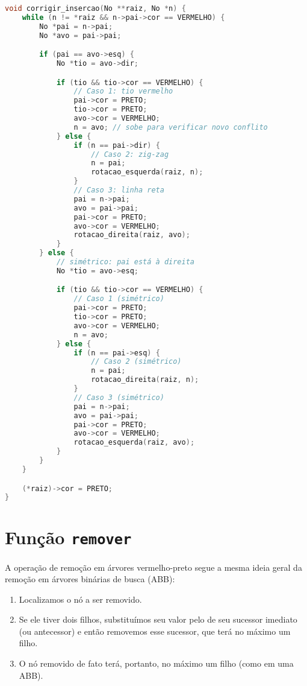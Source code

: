 \begin{lstlisting}[language=C, caption={Correção após inserção em árvore vermelho-preto}, label=lst:corrigir_insercao]
void corrigir_insercao(No **raiz, No *n) {
    while (n != *raiz && n->pai->cor == VERMELHO) {
        No *pai = n->pai;
        No *avo = pai->pai;

        if (pai == avo->esq) {
            No *tio = avo->dir;

            if (tio && tio->cor == VERMELHO) {
                // Caso 1: tio vermelho
                pai->cor = PRETO;
                tio->cor = PRETO;
                avo->cor = VERMELHO;
                n = avo; // sobe para verificar novo conflito
            } else {
                if (n == pai->dir) {
                    // Caso 2: zig-zag
                    n = pai;
                    rotacao_esquerda(raiz, n);
                }
                // Caso 3: linha reta
                pai = n->pai;
                avo = pai->pai;
                pai->cor = PRETO;
                avo->cor = VERMELHO;
                rotacao_direita(raiz, avo);
            }
        } else {
            // simétrico: pai está à direita
            No *tio = avo->esq;

            if (tio && tio->cor == VERMELHO) {
                // Caso 1 (simétrico)
                pai->cor = PRETO;
                tio->cor = PRETO;
                avo->cor = VERMELHO;
                n = avo;
            } else {
                if (n == pai->esq) {
                    // Caso 2 (simétrico)
                    n = pai;
                    rotacao_direita(raiz, n);
                }
                // Caso 3 (simétrico)
                pai = n->pai;
                avo = pai->pai;
                pai->cor = PRETO;
                avo->cor = VERMELHO;
                rotacao_esquerda(raiz, avo);
            }
        }
    }

    (*raiz)->cor = PRETO;
}
\end{lstlisting}

\section{Função {\tt remover}}

A operação de remoção em árvores vermelho-preto segue a mesma ideia geral da remoção em árvores binárias de busca (ABB):

\begin{enumerate}
    \item Localizamos o nó a ser removido.
    \item Se ele tiver dois filhos, substituímos seu valor pelo de seu sucessor imediato (ou antecessor) e então removemos esse sucessor, que terá no máximo um filho.
    \item O nó removido de fato terá, portanto, no máximo um filho (como em uma ABB).
\end{enumerate}

